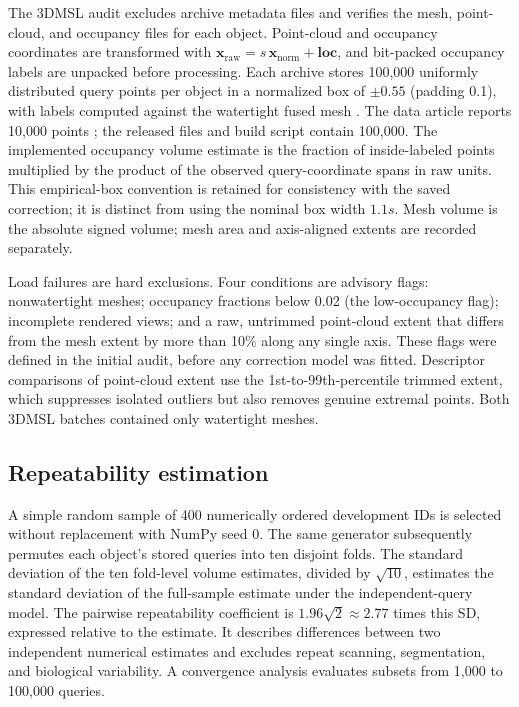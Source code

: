 \documentclass[journal]{IEEEtran}
\begin{document}
The 3DMSL audit excludes archive metadata files and verifies the mesh, point-cloud, and occupancy files for each object. Point-cloud and occupancy coordinates are transformed with $\mathbf{x}_{\mathrm{raw}}=s\,\mathbf{x}_{\mathrm{norm}}+\mathbf{loc}$, and bit-packed occupancy labels are unpacked before processing. Each archive stores 100,000 uniformly distributed query points per object in a normalized box of $\pm0.55$ (padding 0.1), with labels computed against the watertight fused mesh \cite{ref20}. The data article reports 10,000 points \cite{ref11}; the released files and build script contain 100,000. The implemented occupancy volume estimate is the fraction of inside-labeled points multiplied by the product of the observed query-coordinate spans in raw units. This empirical-box convention is retained for consistency with the saved correction; it is distinct from using the nominal box width $1.1s$. Mesh volume is the absolute signed volume; mesh area and axis-aligned extents are recorded separately.

Load failures are hard exclusions. Four conditions are advisory flags: nonwatertight meshes; occupancy fractions below 0.02 (the low-occupancy flag); incomplete rendered views; and a raw, untrimmed point-cloud extent that differs from the mesh extent by more than 10\% along any single axis. These flags were defined in the initial audit, before any correction model was fitted. Descriptor comparisons of point-cloud extent use the 1st-to-99th-percentile trimmed extent, which suppresses isolated outliers but also removes genuine extremal points. Both 3DMSL batches contained only watertight meshes.

\subsection{Repeatability estimation}

A simple random sample of 400 numerically ordered development IDs is selected without replacement with NumPy seed 0. The same generator subsequently permutes each object's stored queries into ten disjoint folds. The standard deviation of the ten fold-level volume estimates, divided by $\sqrt{10}$, estimates the standard deviation of the full-sample estimate under the independent-query model. The pairwise repeatability coefficient is $1.96\sqrt{2}\approx2.77$ times this SD, expressed relative to the estimate. It describes differences between two independent numerical estimates and excludes repeat scanning, segmentation, and biological variability. A convergence analysis evaluates subsets from 1,000 to 100,000 queries.
\end{document}
